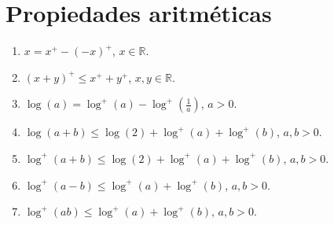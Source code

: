 \section{Propiedades aritméticas}
\begin{lemma}
    \hfill
    \begin{enumerate}
        \item $x = x^+ - (-x)^+$, $x \in \mathbb{R}$.
        \item $(x+y)^+ \leq x^+ + y^+$, $x, y \in \mathbb{R}$.
        \item $\log(a) = \log^+(a) - \log^+\left(\frac{1}{a}\right)$, $a > 0$.
        \item $\log(a+b) \leq \log(2) + \log^+(a) + \log^+(b)$, $a, b > 0$.
        \item $\log^+(a+b) \leq \log(2) + \log^+(a) + \log^+(b)$, $a, b > 0$.
        \item $\log^+(a-b) \leq \log^+(a) + \log^+(b)$, $a, b > 0$.
        \item $\log^+(ab) \leq \log^+(a) + \log^+(b)$, $a, b > 0$.
    \end{enumerate}
\end{lemma}

